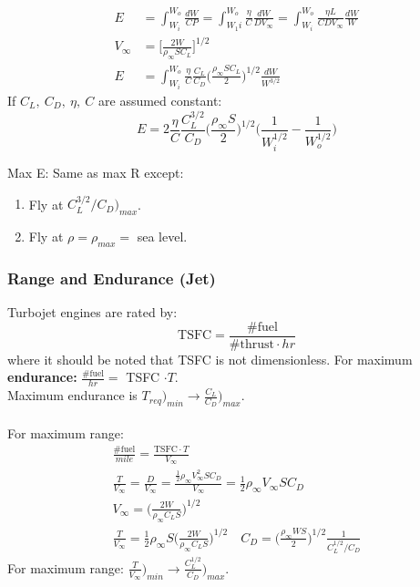 \documentclass[draft=false, titlepage]{article}
\begin{document}
\begin{align*}
E &= \int_{W_i}^{W_o} \frac{dW}{CP} = \int_{W_1i}^{W_o} \frac{\eta}{C} \frac{dW}{DV_\infty} = \int_{W_i}^{W_o} \frac{\eta L}{CD V_\infty} \frac{dW}{W}\\
V_\infty &= \Big[\frac{2W}{\rho_\infty S C_L}\Big]^{1/2}\\
E &= \int_{W_i}^{W_o} \frac{\eta}{C} \frac{C_L}{C_D} \Big(\frac{\rho_\infty S C_L}{2}\Big)^{1/2} \frac{dW}{W^{3/2}}
\end{align*}
If $C_L,\ C_D,\ \eta,\ C$ are assumed constant:
\begin{equation*}
\boxed{E = 2\frac{\eta}{C} \frac{C_L^{3/2}}{C_D} \Big(\frac{\rho_\infty S}{2}\Big)^{1/2} \Big(\frac{1}{W_i^{1/2}} - \frac{1}{W_o^{1/2}}\Big)}
\end{equation*}

Max E: Same as max R except:
\begin{enumerate}
	\item Fly at $C_L^{3/2}/C_D\Big)_{max}$.
	\item Fly at $\rho = \rho_{max} =$ sea level.
\end{enumerate}

\subsubsection{Range and Endurance (Jet)}
Turbojet engines are rated by:
\begin{equation*}
\text{TSFC} = \frac{\text{\# fuel}}{\text{\# thrust}\cdot hr}
\end{equation*}
where it should be noted that TSFC is not dimensionless. For maximum \textbf{endurance:} $\frac{\text{\# fuel}}{hr} =$ TSFC $\cdot T$.\\
Maximum endurance is $T_{req}\Big)_{min} \rightarrow \frac{C_L}{C_D}\Big)_{max}$.
\paragraph*{} For maximum range:
\begin{gather*}
\frac{\text{\# fuel}}{mile} = \frac{\text{TSFC}\cdot T}{V_\infty}\\
\frac{T}{V_\infty} = \frac{D}{V_\infty} = \frac{\frac{1}{2} \rho_\infty V_\infty^2 S C_D}{V_\infty} = \frac{1}{2} \rho_\infty V_\infty S C_D\\
V_\infty = \Big(\frac{2W}{\rho_\infty C_L S}\Big)^{1/2}\\
\frac{T}{V_\infty} = \frac{1}{2}\rho_\infty S \Big(\frac{2W}{\rho_\infty C_L S}\Big)^{1/2} \quad
C_D = \Big(\frac{\rho_\infty WS}{2}\Big)^{1/2} \frac{1}{C_L^{1/2}/C_D}
\end{gather*}
For maximum range: $\frac{T}{V_\infty}\Big)_{min} \rightarrow \frac{C_L^{1/2}}{C_D}\Big)_{max}$.
\end{document}
